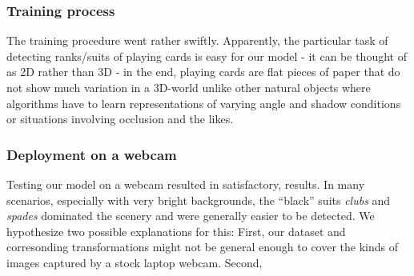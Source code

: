 \documentclass[a4paper]{article}
\begin{document}
\subsubsection*{Training process}
The training procedure went rather swiftly. Apparently,  the particular task of detecting ranks/suits of playing cards is easy for our model - it can be thought of as 2D rather than 3D - in the end, playing cards are flat pieces of paper that do not show much variation in a 3D-world unlike other natural objects where algorithms have to learn representations of varying angle and shadow conditions or situations involving occlusion and the likes. \\
\subsubsection*{Deployment on a webcam}
Testing our model on a webcam resulted in satisfactory,  results. In many scenarios, especially with very bright backgrounds, the ``black'' suits \textit{clubs} and \textit{spades} dominated the scenery and were generally easier to be detected. We hypothesize two possible explanations for this: First, our dataset and corresonding transformations might not be general enough to cover the kinds of images captured by a stock laptop webcam. Second,   
\end{document}
